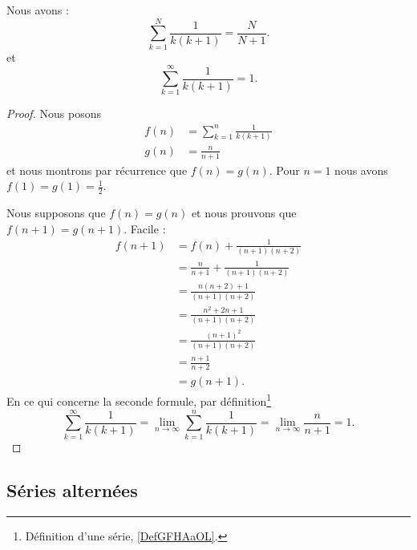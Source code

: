 \begin{lemma}     \label{LEMooKDHPooPlFTIT}
	Nous avons :
	\begin{equation}
		\sum_{k=1}^N\frac{1}{ k(k+1) }=\frac{ N }{ N+1 }.
	\end{equation}
	et
	\begin{equation}
		\sum_{k=1}^{\infty}\frac{1}{ k(k+1) }=1.
	\end{equation}
\end{lemma}

\begin{proof}
	Nous posons
	\begin{subequations}
		\begin{align}
			f(n) & =\sum_{k=1}^n\frac{1}{ k(k+1) } \\
			g(n) & =\frac{ n }{ n+1 }
		\end{align}
	\end{subequations}
	et nous montrons par récurrence que \( f(n)=g(n)\). Pour \( n=1\) nous avons \( f(1)=g(1)=\frac{ 1 }{2}\).

	Nous supposons que \( f(n)=g(n)\) et nous prouvons que \( f(n+1)=g(n+1)\). Facile :
	\begin{subequations}
		\begin{align}
			f(n+1) & =f(n)+\frac{1}{ (n+1)(n+2) }              \\
			       & =\frac{ n }{ n+1 }+\frac{1}{ (n+1)(n+2) } \\
			       & =\frac{ n(n+2)+1 }{ (n+1)(n+2) }          \\
			       & =\frac{ n^2+2n+1 }{ (n+1)(n+2) }          \\
			       & =\frac{ (n+1)^2 }{ (n+1)(n+2) }           \\
			       & =\frac{ n+1 }{ n+2 }                      \\
			       & =g(n+1).
		\end{align}
	\end{subequations}
	En ce qui concerne la seconde formule, par définition\footnote{Définition d'une série, \ref{DefGFHAaOL}.}
	\begin{equation}
		\sum_{k=1}^{\infty}\frac{1}{ k(k+1) }=\lim_{n\to \infty} \sum_{k=1}^n\frac{1}{ k(k+1) }=\lim_{n\to \infty}\frac{ n }{ n+1 } =1.
	\end{equation}
\end{proof}

\subsection{Séries alternées}


